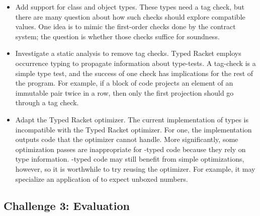 \begin{itemize}
  \item
    Add support for class and object types.
    These types need a tag check, but there are many question about how such
     checks should explore compatible values.
    One idea is to mimic the first-order checks done by the contract system;
     the question is whether those checks suffice for soundness.
  \item
    Investigate a static analysis to remove tag checks.
    Typed Racket employs occurrence typing to propagate information about type-tests.
    A tag-check is a simple type test, and the success of one check has implications
     for the rest of the program.
    For example, if a block of code projects an element of an immutable pair twice in a row,
     then only the first projection should go through a tag check.
  \item
    Adapt the Typed Racket optimizer.
    The current implementation of \tshallow{} types is incompatible with the Typed
     Racket optimizer.
    For one, the implementation outputs code that the optimizer cannot handle.
    More significantly, some optimization passes are inappropriate for \tshallow{}-typed
     code because they rely on \tdeep{} type information.
    \tShallow{}-typed code may still benefit from simple optimizations, however,
     so it is worthwhile to try reusing the optimizer.
    For example, it may specialize an application of \racketcode{+} to expect unboxed numbers.
\end{itemize}


\subsection{Challenge 3: Evaluation}


